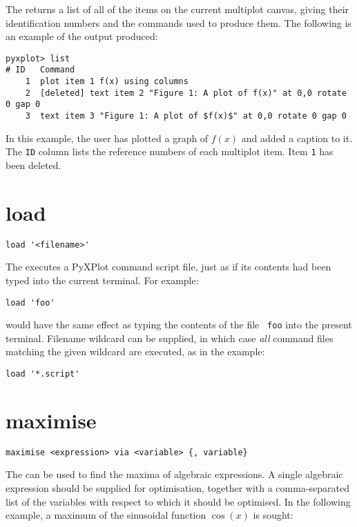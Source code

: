 The  returns a list of all of the items on the current multiplot
canvas, giving their identification numbers and the commands used to produce
them.  The following is an example of the output produced:

{\footnotesize
\begin{verbatim}
pyxplot> list
# ID   Command
    1  plot item 1 f(x) using columns
    2  [deleted] text item 2 "Figure 1: A plot of f(x)" at 0,0 rotate 0 gap 0
    3  text item 3 "Figure 1: A plot of $f(x)$" at 0,0 rotate 0 gap 0
\end{verbatim}
}

In this example, the user has plotted a graph of $f(x)$ and added a caption to
it. The {\tt ID} column lists the reference numbers of each multiplot item.
Item {\tt 1} has been deleted.


\section{load}

\begin{verbatim}
load '<filename>'
\end{verbatim}

The  executes a PyXPlot command script file, just as if its
contents had been typed into the current terminal. For example:

\begin{verbatim}
load 'foo'
\end{verbatim}

\noindent would have the same effect as typing the contents of the file {\tt
foo} into the present terminal.  Filename wildcard can be supplied, in which
case {\it all} command files matching the given wildcard are executed, as in
the example:

\begin{verbatim}
load '*.script'
\end{verbatim}


\section{maximise}

\begin{verbatim}
maximise <expression> via <variable> {, variable}
\end{verbatim}

The  can be used to find the maxima of algebraic expressions.
A single algebraic expression should be supplied for optimisation, together
with a comma-separated list of the variables with respect to which it should be
optimised.  In the following example, a maximum of the sinusoidal function
$\cos(x)$ is sought:

